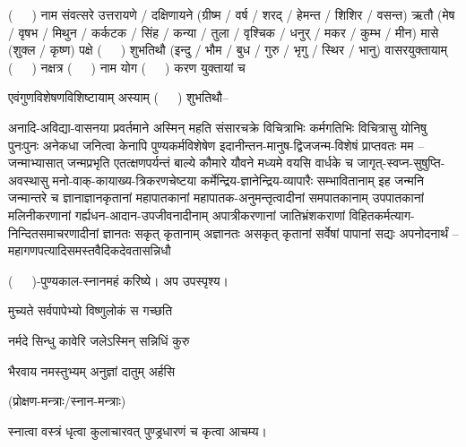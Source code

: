 \mbox{(~~~)} नाम संवत्सरे उत्तरायणे / दक्षिणायने 
(ग्रीष्म / वर्ष / शरद् / हेमन्त / शिशिर / वसन्त) ऋतौ  (मेष / वृषभ / मिथुन / कर्कटक / सिंह / कन्या / तुला / 
वृश्चिक / धनुर् / मकर / कुम्भ / मीन) मासे (शुक्ल / कृष्ण) पक्षे \mbox{(~~~)} शुभतिथौ
(इन्दु / भौम / बुध / गुरु / भृगु / स्थिर / भानु) वासरयुक्तायाम्
\mbox{(~~~)} नक्षत्र \mbox{(~~~)} नाम  योग  \mbox{(~~~)} करण युक्तायां च 

एवं\-गुण\-विशेषण\-विशिष्टायाम् अस्याम् \mbox{(~~~)} शुभतिथौ–

अनादि-अविद्या-वासनया प्रवर्तमाने अस्मिन् महति संसारचक्रे विचित्राभिः कर्मगतिभिः विचित्रासु योनिषु
पुनःपुनः अनेकधा जनित्वा केनापि पुण्यकर्मविशेषेण इदानीन्तन-मानुष-द्विजजन्म-विशेषं प्राप्तवतः मम –\\
जन्माभ्यासात् जन्मप्रभृति एतत्क्षणपर्यन्तं बाल्ये कौमारे यौवने मध्यमे वयसि वार्धके च
जागृत्-स्वप्न-सुषुप्ति-अवस्थासु मनो-वाक्-कायाख्य-त्रिकरणचेष्टया कर्मेन्द्रिय-ज्ञानेन्द्रिय-व्यापारैः
सम्भावितानाम् इह जन्मनि जन्मान्तरे च ज्ञानाज्ञानकृतानां महापातकानां महापातक-अनुमन्तृत्वादी\-नां
समपातकानाम् उपपातकानां मलिनी\-करणानां गर्ह्यधन-आदान-उपजीवनादीनाम् अपात्रीकरणानां जातिभ्रंश\-कराणां
विहित\-कर्म\-त्याग-निन्दित\-समाचरणादीनां ज्ञानतः सकृत् कृतानाम् अज्ञानतः असकृत् कृतानां सर्वेषां पापानां
सद्यः अपनोदनार्थं –\\
महागणपत्यादिसमस्तवैदिकदेवतासन्निधौ

\mbox{(~~~)}-पुण्यकाल-स्नानमहं करिष्ये। अप उपस्पृश्य।

{मुच्यते सर्वपापेभ्यो विष्णुलोकं स गच्छति}%

{नर्मदे सिन्धु कावेरि जलेऽस्मिन् सन्निधिं कुरु}

{भैरवाय नमस्तुभ्यम् अनुज्ञां दातुम् अर्हसि}

\centerline{(प्रोक्षण-मन्त्राः/स्नान-मन्त्राः)} 

स्नात्वा वस्त्रं धृत्वा कुलाचारवत् पुण्ड्रधारणं च कृत्वा आचम्य।

\closesection
